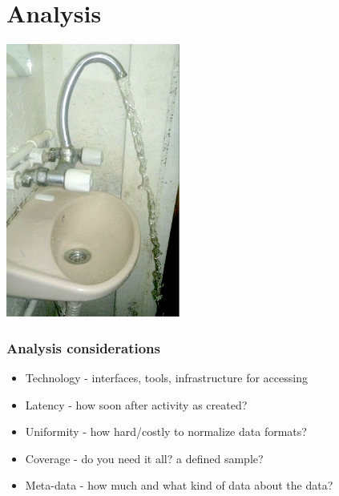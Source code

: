 \documentclass{beamer}
\begin{document}
\section{Analysis}
{
\begin{frame}
\textcolor{black} {
\hfill \Huge \insertsection}
\end{frame}
}

\begin{frame}
  \begin{center}
    \includegraphics[height=9cm]{./imgs/sinkfail.png}
  \end{center}
\end{frame}



\begin{frame}\frametitle{Analysis considerations}
{\Large
\begin{itemize}
\item Technology - interfaces, tools, infrastructure for accessing
\item Latency - how soon after activity as created?
\item Uniformity - how hard/costly to normalize data formats?
\item Coverage - do you need it all? a defined sample?
\item Meta-data -  how much and what kind of data about the data?
\end{itemize}
}
\end{frame}
\end{document}

